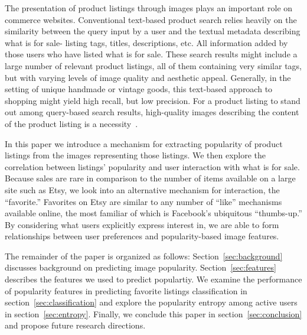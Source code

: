 \documentclass[conference,a4paper]{IEEEtran}
\begin{document}
The presentation of product listings through images plays
an important role on commerce websites. Conventional text-based  product search relies heavily on the similarity between 
the query input by a user and the textual metadata describing what is for sale- listing tags, titles, descriptions, etc. All information added by those users who have listed what is for sale. These search
results might include a large number of relevant product listings, all of them
containing very similar tags, but with varying levels of image quality
and aesthetic appeal. Generally, in the setting of unique handmade or vintage goods, this text-based approach to shopping might yield high recall, but low precision. For a product listing to stand out among query-based
search results, high-quality images describing the content of the
product listing is a necessity~\cite{wang2011aesthetics,obrador2009role}. 
 
In this paper we introduce a mechanism for extracting popularity of product listings from the images representing those listings. We then explore the correlation between listings' popularity and user interaction with what is for sale. Because sales are rare in comparison to the number of items available on a large site such as Etsy, we look into an alternative mechanism for interaction, the ``favorite.'' Favorites on Etsy are similar to any number of ``like'' mechanisms available online, the most familiar of which is Facebook's ubiquitous ``thumbs-up.'' By considering what users explicitly express interest in, we are able to form relationships between user preferences and popularity-based image features. 
 
The remainder of the paper is organized as follows:
Section~\ref{sec:background} discusses background on predicting image popularity.
Section~\ref{sec:features} describes the features we used to predict populartiy.  We examine the
performance of popularity features in predicting favorite listings classification in
section~\ref{sec:classification} and explore the popularity entropy among active users in
section~\ref{sec:entropy}. Finally, we conclude this paper in
section~\ref{sec:conclusion} and propose future research directions.
\end{document}

